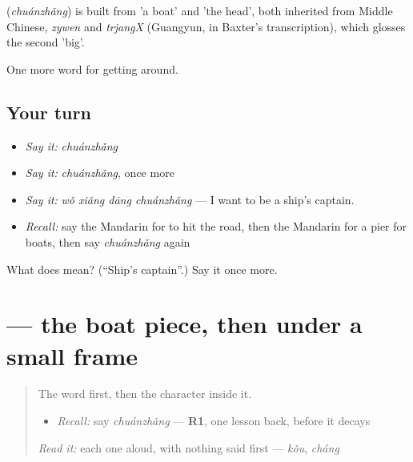 \begin{cousinweb}
\textbf{} (\emph{chuánzhǎng}) is built from  'a boat' and  'the head', both inherited from Middle Chinese, \emph{zywen} and \emph{trjangX} (Guangyun, in Baxter's transcription), which glosses the second 'big'.
\end{cousinweb}

\begin{grammarlens}[title={What you've built}]
One more word for getting around.
\end{grammarlens}

\subsection*{Your turn}
\begin{itemize}
\raggedright
  \item \emph{Say it:} \emph{chuánzhǎng}
  \item \emph{Say it:} \emph{chuánzhǎng}, once more
  \item \emph{Say it:} \emph{wǒ xiǎng dāng chuánzhǎng} — I want to be a ship's captain.
  \item \emph{Recall:} say the Mandarin for to hit the road, then the Mandarin for a pier for boats, then say \emph{chuánzhǎng} again
\end{itemize}

\begin{tcolorbox}[breakable,colback=teal!4,colframe=teal!35!black,title={Before you move on}]
What does  mean? (\textquotedblleft{}Ship's captain\textquotedblright{}.) Say it once more.
\end{tcolorbox}
\section[\texorpdfstring{\zh{船} (chuán)}{船 (chuán)}]{ — the boat piece, then  under a small frame}

\label{lesson:ZH-W411-chuan-boat}



\begin{quote}
The word first, then the character inside it.

\begin{itemize}
\raggedright
  \item \emph{Recall:} say \emph{chuánzhǎng} — \textbf{R1}, one lesson back, before it decays
\end{itemize}

\begin{quote}
 
\end{quote}

\emph{Read it:} each one aloud, with nothing said first — \emph{kǒu}, \emph{cháng}
\end{quote}

